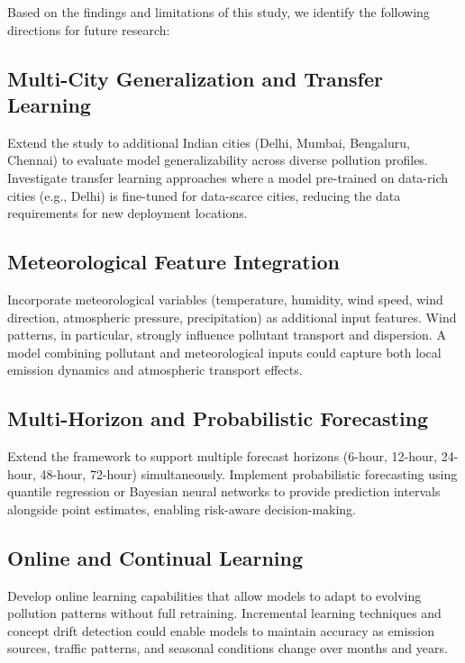 Based on the findings and limitations of this study, we identify the following directions for future research:

\subsection{Multi-City Generalization and Transfer Learning}

Extend the study to additional Indian cities (Delhi, Mumbai, Bengaluru, Chennai) to evaluate model generalizability across diverse pollution profiles. Investigate transfer learning approaches where a model pre-trained on data-rich cities (e.g., Delhi) is fine-tuned for data-scarce cities, reducing the data requirements for new deployment locations.

\subsection{Meteorological Feature Integration}

Incorporate meteorological variables (temperature, humidity, wind speed, wind direction, atmospheric pressure, precipitation) as additional input features. Wind patterns, in particular, strongly influence pollutant transport and dispersion. A model combining pollutant and meteorological inputs could capture both local emission dynamics and atmospheric transport effects.

\subsection{Multi-Horizon and Probabilistic Forecasting}

Extend the framework to support multiple forecast horizons (6-hour, 12-hour, 24-hour, 48-hour, 72-hour) simultaneously. Implement probabilistic forecasting using quantile regression or Bayesian neural networks to provide prediction intervals alongside point estimates, enabling risk-aware decision-making.

\subsection{Online and Continual Learning}

Develop online learning capabilities that allow models to adapt to evolving pollution patterns without full retraining. Incremental learning techniques and concept drift detection could enable models to maintain accuracy as emission sources, traffic patterns, and seasonal conditions change over months and years.

